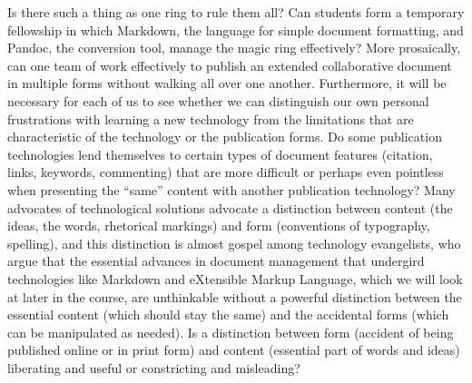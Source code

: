 \documentclass[]{article}
\begin{document}
Is there such a thing as one ring to rule them all? Can students form a
temporary fellowship in which Markdown, the language for simple document
formatting, and Pandoc, the conversion tool, manage the magic ring
effectively? More prosaically, can one team of work effectively to
publish an extended collaborative document in multiple forms without
walking all over one another. Furthermore, it will be necessary for each
of us to see whether we can distinguish our own personal frustrations
with learning a new technology from the limitations that are
characteristic of the technology or the publication forms. Do some
publication technologies lend themselves to certain types of document
features (citation, links, keywords, commenting) that are more difficult
or perhaps even pointless when presenting the ``same'' content with
another publication technology? Many advocates of technological
solutions advocate a distinction between content (the ideas, the words,
rhetorical markings) and form (conventions of typography, spelling), and
this distinction is almost gospel among technology evangelists, who
argue that the essential advances in document management that undergird
technologies like Markdown and eXtensible Markup Language, which we will
look at later in the course, are unthinkable without a powerful
distinction between the essential content (which should stay the same)
and the accidental forms (which can be manipulated as needed). Is a
distinction between form (accident of being published online or in print
form) and content (essential part of words and ideas) liberating and
useful or constricting and misleading?
\end{document}

